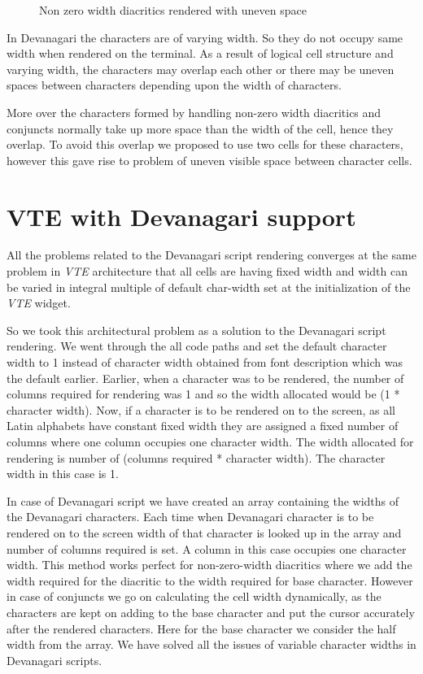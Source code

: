 \begin{figure}[htbp]
\centerline{}
\caption{Non zero width diacritics rendered with uneven space } \label{Gnome Terminal9}
\end{figure}

In Devanagari the characters are of varying width. So they do not occupy same width when rendered on the terminal. As a result of logical cell structure and varying width, the characters may overlap each other or there may be uneven spaces between characters depending upon the width of characters.

More over the characters formed by handling non-zero width diacritics and conjuncts normally take up more space than the width of the cell, hence they overlap. To avoid this overlap we proposed to use two cells for these characters, however this gave rise to problem of uneven visible space between character cells.

\section{VTE  with Devanagari support}
All the problems related to the Devanagari script rendering converges at the same problem in \textit{VTE} architecture that all cells are having fixed width and width can be varied in integral multiple of default char-width set at the initialization of the \textit{VTE} widget.

So we took this architectural problem as a solution to the Devanagari script rendering. We went through the all code paths and set the default character width to 1 instead of character width  obtained from font description which was the default earlier. Earlier, when a character was to be rendered, the number of columns required for rendering was 1 and so the width allocated would be (1 * character width). Now, if a character is to be rendered on to the screen, as all Latin alphabets have constant fixed width they are assigned a fixed number of columns where one column occupies one character width. The width allocated for rendering is number of (columns required * character width). The character width in this case is 1.

In case of Devanagari script we have created an array containing the widths of the Devanagari characters. Each time when Devanagari character is to be rendered on to the screen width of that character is looked up in the array and number of columns required is set. A column in this case occupies one character width. This method works perfect for non-zero-width diacritics where we add the width required for the diacritic to the width required for base character. However in case of conjuncts we go on calculating the cell width dynamically, as the characters are kept on adding to the base character and put the cursor accurately after the rendered characters. Here for the base character we consider the half width from the array. We have solved all the issues of variable character widths in Devanagari scripts.


